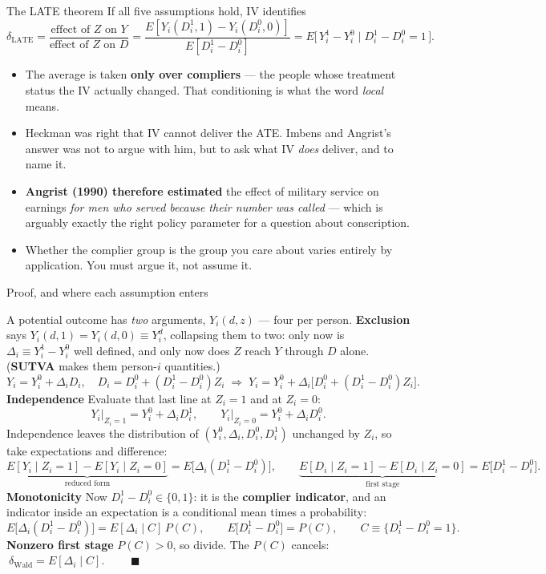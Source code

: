\documentclass[
  11pt,
  ignorenonframetext,
  aspectratio=169,
]{beamer}
\providecommand{\tightlist}{%
  \setlength{\itemsep}{0pt}\setlength{\parskip}{0pt}}
\begin{document}
\begin{frame}{The LATE theorem}
\protect{}\label{the-late-theorem}
If all five assumptions hold, IV identifies \[
\delta_{\text{LATE}}
= \frac{\text{effect of } Z \text{ on } Y}{\text{effect of } Z \text{ on } D}
= \frac{E[Y_i(D^1_i,1) - Y_i(D^0_i,0)]}{E[D^1_i - D^0_i]}
= E\big[\,Y^1_i - Y^0_i \;\big|\; D^1_i - D^0_i = 1\,\big].
\]

\begin{itemize}
\tightlist
\item
  The average is taken \textbf{only over compliers} --- the people whose
  treatment status the IV actually changed. That conditioning is what
  the word \emph{local} means.
\item
  Heckman was right that IV cannot deliver the ATE. Imbens and Angrist's
  answer was not to argue with him, but to ask what IV \emph{does}
  deliver, and to name it.
\item
  \textbf{Angrist (1990) therefore estimated} the effect of military
  service on earnings \emph{for men who served because their number was
  called} --- which is arguably exactly the right policy parameter for a
  question about conscription.
\item
  Whether the complier group is the group you care about varies entirely
  by application. You must argue it, not assume it.
\end{itemize}
\end{frame}

\begin{frame}{Proof, and where each assumption enters}
\protect{}\label{proof-and-where-each-assumption-enters}
\footnotesize

A potential outcome has \emph{two} arguments, \(Y_i(d,z)\) --- four per
person. \textbf{Exclusion} says \(Y_i(d,1) = Y_i(d,0) \equiv Y^d_i\),
collapsing them to two: only now is \(\Delta_i \equiv Y^1_i - Y^0_i\)
well defined, and only now does \(Z\) reach \(Y\) through \(D\) alone.
(\textbf{SUTVA} makes them person-\(i\) quantities.) \[
Y_i = Y^0_i + \Delta_i D_i,
\quad
D_i = D^0_i + (D^1_i - D^0_i) Z_i
\;\Longrightarrow\;
Y_i = Y^0_i + \Delta_i \big[D^0_i + (D^1_i - D^0_i)Z_i\big].
\] \textbf{Independence} Evaluate that last line at \(Z_i = 1\) and at
\(Z_i = 0\): \[
Y_i\big|_{Z_i = 1} = Y^0_i + \Delta_i D^1_i,
\qquad
Y_i\big|_{Z_i = 0} = Y^0_i + \Delta_i D^0_i .
\] Independence leaves the distribution of
\((Y^0_i, \Delta_i, D^0_i, D^1_i)\) unchanged by \(Z_i\), so take
expectations and difference: \[
\underbrace{E[Y_i \mid Z_i{=}1] - E[Y_i \mid Z_i{=}0]}_{\text{reduced form}} = E\big[\Delta_i (D^1_i - D^0_i)\big],
\qquad
\underbrace{E[D_i \mid Z_i{=}1] - E[D_i \mid Z_i{=}0]}_{\text{first stage}} = E\big[D^1_i - D^0_i\big].
\] \textbf{Monotonicity} Now \(D^1_i - D^0_i \in \{0,1\}\): it is the
\textbf{complier indicator}, and an indicator inside an expectation is a
conditional mean times a probability: \[
E\big[\Delta_i(D^1_i - D^0_i)\big] = E[\Delta_i \mid C]\,P(C),
\qquad
E\big[D^1_i - D^0_i\big] = P(C), \qquad C \equiv \{D^1_i - D^0_i = 1\}.
\] \textbf{Nonzero first stage} \(P(C) > 0\), so divide. The \(P(C)\)
cancels: \(\ \delta_{\text{Wald}} = E[\Delta_i \mid C]\).
\(\qquad\blacksquare\)
\end{frame}
\end{document}
